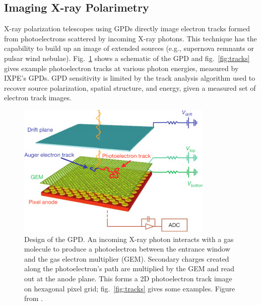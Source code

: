 \subsection{Imaging X-ray Polarimetry}

X-ray polarization telescopes using GPDs directly image electron tracks formed from photoelectrons scattered by incoming X-ray photons. This technique has the capability to build up an image of extended sources (e.g., supernova remnants or pulsar wind nebulae). Fig.~\ref{fig:gpd} shows a schematic of the GPD and fig.~\ref{fig:tracks} gives example photoelectron tracks at various photon energies, measured by IXPE's GPDs. 
GPD sensitivity is limited by the track analysis algorithm used to recover source polarization, spatial structure, and energy, given a measured set of electron track images.

\begin{figure}[h]
\centering
\includegraphics[scale=.85]{figures/gpd.jpg}
\caption{Design of the GPD. An incoming X-ray photon interacts with a gas molecule to produce a photoelectron between the entrance window and the gas electron multiplier (GEM). Secondary charges created along the photoelectron's path are multiplied by the GEM and read out at the anode plane. This forms a 2D photoelectron track image on hexagonal pixel grid; fig.~\ref{fig:tracks} gives some examples. Figure from \citet{baldini_design_2021}.}
\label{fig:gpd}       %
\end{figure}


